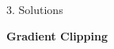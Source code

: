 \documentclass[final]{beamer}
\begin{document}
\begin{frame}[t]
\begin{columns}[t,totalwidth=\textwidth]
\begin{column}{0.3\textwidth}
                
    \begin{block}{3. Solutions }

        \textbf{Gradient Clipping}
        
    

\end{block}
\end{column}
\end{columns}
\end{frame}
\end{document}
